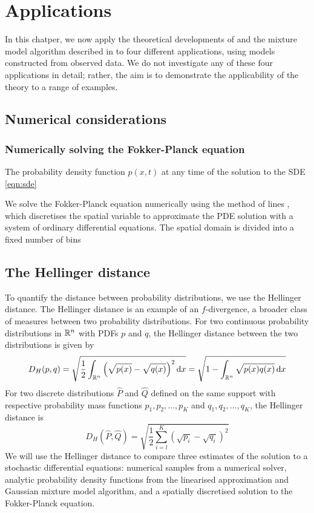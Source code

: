 \chapter{Applications}\label{ch:appls}



In this chatper, we now apply the theoretical developments of  and the mixture model algorithm described in  to four different applications, using models constructed from observed data.
We do not investigate any of these four applications in detail; rather, the aim is to demonstrate the applicability of the theory to a range of examples.



\section{Numerical considerations}






\subsection{Numerically solving the Fokker-Planck equation}

The probability density function \(p\!\left(x,t\right)\) at any time of the solution to the SDE \cref{eqn:sde}



We solve the Fokker-Planck equation numerically using the method of lines \citep{}, which discretises the spatial variable to approximate the PDE solution with a system of ordinary differential equations.
The spatial domain is divided into a fixed number of bins


\section{The Hellinger distance}
To quantify the distance between probability distributions, we use the Hellinger distance.
The Hellinger distance is an example of an \(f\)-divergence, a broader class of measures between two probability distributions.
For two continuous probability distributions in \(\mathbb{R}^n\) with PDFs \(p\) and \(q\), the Hellinger distance between the two distributions is given by
\[
	D_H\!\left(p, q\right) = \sqrt{\frac12 \int_{\R^n}{\left(\sqrt{p(x)} - \sqrt{q(x)}\right)^2\dif x}} = \sqrt{1 - \int_{\R^n}{\sqrt{p(x)q(x)}\dif x}}
\]
For two discrete distributions \(\hat{P}\) and \(\hat{Q}\) defined on the same support with respective probability mass functions \(p_1, p_2, \dotsc, p_K\) and \(q_1, q_2, \dotsc, q_K\), the Hellinger distance is
\begin{equation}\label{eqn:hell_disc}
	D_H\!\left(\hat{P}, \hat{Q}\right) = \sqrt{\frac12 \sum_{i=l}^{K}\left(\sqrt{p_i} - \sqrt{q_i}\right)^2}
\end{equation}
We will use the Hellinger distance to compare three estimates of the solution to a stochastic differential equations: numerical samples from a numerical solver, analytic probability density functions from the linearised approximation and Gaussian mixture model algorithm, and a spatially discretised solution to the Fokker-Planck equation.

